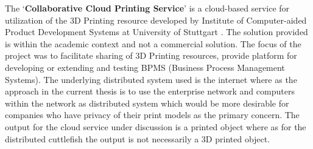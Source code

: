 The {\lq}\textbf{Collaborative Cloud Printing Service}{\rq} is a cloud-based service for utilization of the 3D Printing resource developed by Institute of Computer-aided Product Development Systems at University of Stuttgart \cite{Baumann2016}. The solution provided is within the academic context and not a commercial solution. The focus of the project was to facilitate sharing of 3D Printing resources, provide platform for developing or extending and testing BPMS (Business Process Management Systems). The underlying distributed system used is the internet where as the approach in the current thesis is to use the enterprise network and computers within the network as distributed system which would be more desirable for companies who have privacy of their print models as the primary concern. The output for the cloud service under discussion is a printed object where as for the distributed cuttlefish the output is not necessarily a 3D printed object.  

